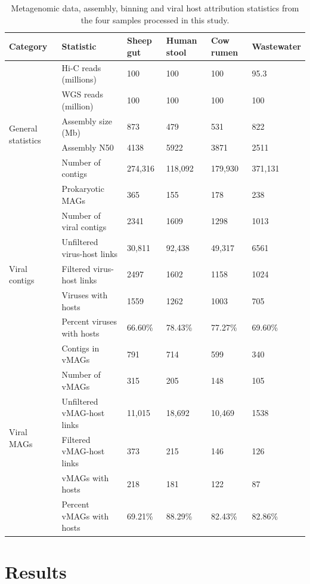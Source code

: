\begin{table}[]
\centering
\begin{tabular}{llllll}
\toprule
Category & Statistic & Sheep gut & Human stool & Cow rumen & Wastewater \\
\midrule
\multirow{6}{*}{General statistics} & Hi-C reads (millions) & 100 & 100 & 100 & 95.3 \\
 & WGS reads (million) & 100 & 100 & 100 & 100 \\
 & Assembly size (Mb) & 873 & 479 & 531 & 822 \\
 & Assembly N50 & 4138 & 5922 & 3871 & 2511 \\
 & Number of contigs & 274,316 & 118,092 & 179,930 & 371,131 \\
 & Prokaryotic MAGs & 365 & 155 & 178 & 238 \\
\midrule
\multirow{5}{*}{Viral contigs} & Number of viral contigs & 2341 & 1609 & 1298 & 1013 \\
 & Unfiltered virus-host links & 30,811 & 92,438 & 49,317 & 6561 \\
 & Filtered virus-host links & 2497 & 1602 & 1158 & 1024 \\
 & Viruses with hosts & 1559 & 1262 & 1003 & 705 \\
 & Percent viruses with hosts & 66.60\% & 78.43\% & 77.27\% & 69.60\% \\
\midrule
\multirow{6}{*}{Viral MAGs} & Contigs in vMAGs & 791 & 714 & 599 & 340 \\
 & Number of vMAGs & 315 & 205 & 148 & 105 \\
 & Unfiltered vMAG-host links & 11,015 & 18,692 & 10,469 & 1538 \\
 & Filtered vMAG-host links & 373 & 215 & 146 & 126 \\
 & vMAGs with hosts & 218 & 181 & 122 & 87 \\
 & Percent vMAGs with hosts & 69.21\% & 88.29\% & 82.43\% & 82.86\% \\
\bottomrule
\end{tabular}
\caption{Metagenomic data, assembly, binning and viral host attribution statistics from the four samples processed in this study.}
\end{table}


\section*{Results}

